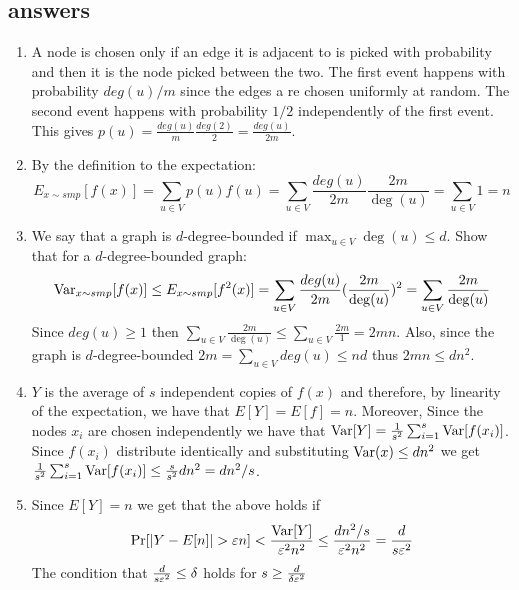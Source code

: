 \subsection*{answers}
\begin{enumerate}
\item A node is chosen only if an edge it is adjacent to is picked with probability and then it is the node picked between the two.
The first event happens with probability $deg(u)/m$ since the edges a re chosen uniformly at random.
The second event happens with probability $1/2$ independently of the first event. This gives $p(u) = \frac{deg(u)}{m}\frac{deg(2)}{2} = \frac{deg(u)}{2m}$. 


\item By the definition to the expectation:
\[
E_{x \sim smp} [f(x)] = \sum_{u\in V} p(u) f(u) = \sum_{u\in V}  \frac{deg(u)}{2m} \frac{2m}{\deg(u)} =  \sum_{u\in V}1 = n
\]

\item We say that a graph is $d$-degree-bounded if $\max_{u \in V} \deg(u) \le
d$. Show that for a $d$-degree-bounded graph:
\[
{\operatorname{Var}}_{x \sim smp} [f(x)] \le E_{x \sim smp} [f^2(x)]  = \sum_{u\in V}\frac{deg(u)}{2m} (\frac{2m}{\deg(u)})^2 =  \sum_{u\in V}\frac{2m}{\deg(u)} 
\]
Since $deg(u) \ge 1$ then  $\sum_{u\in V}\frac{2m}{\deg(u)} \le  \sum_{u\in V}\frac{2m}{1} = 2mn$.
Also, since the graph is $d$-degree-bounded $2m = \sum_{u \in V}deg(u) \le nd$ thus $ 2mn \le dn^2$.

\item $Y$ is the average of $s$ independent copies of $f(x)$ and therefore, by linearity of the expectation, 
we have that $E[Y] = E[f] = n$. Moreover, Since the nodes $x_i$ are chosen independently we have that 
${\operatorname{Var}}[Y] = \frac{1}{s^2}\sum_{i=1}^{s}{\operatorname{Var}}[f(x_i)]$. Since $f(x_i)$ distribute identically and 
substituting ${\operatorname{Var}}(x) \le dn^2$ we get $\frac{1}{s^2}\sum_{i=1}^{s}{\operatorname{Var}}[f(x_i)]  \le \frac{s}{s^2}dn^2 = dn^2/s$.

\item Since $E[Y] = n$ we get that the above holds if 
\[
\Pr[|Y - E[n]| > \varepsilon n ] < \frac{{\operatorname{Var}}[Y]}{\varepsilon^2 n^2} \le \frac{dn^2/s}{\varepsilon^2 n^2}  = \frac{d}{s \varepsilon^2}
\]
The condition that $\frac{d}{s \varepsilon^2} \le \delta$ holds for $s \ge \frac{d}{\delta \varepsilon^2}$
\end{enumerate}
\pagebreak




